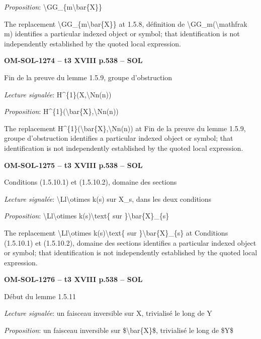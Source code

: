 \emph{Proposition}: \textbackslash{}GG\_\{m\textbackslash{}bar\{X\}\}\par
The replacement \textbackslash{}GG\_\{m\textbackslash{}bar\{X\}\} at 1.5.8, définition de \textbackslash{}GG\_m(\textbackslash{}mathfrak m) identifies a particular indexed object or symbol; that identification is not independently established by the quoted local expression.\par
\par\noindent\textbf{OM-SOL-1274 -- t3 XVIII p.538 -- SOL}\par
Fin de la preuve du lemme 1.5.9, groupe d'obstruction\par
\emph{Lecture signalée}: H\textasciicircum{}\{1\}(X,\textbackslash{}Nn(n))\par
\emph{Proposition}: H\textasciicircum{}\{1\}(\textbackslash{}bar\{X\},\textbackslash{}Nn(n))\par
The replacement H\textasciicircum{}\{1\}(\textbackslash{}bar\{X\},\textbackslash{}Nn(n)) at Fin de la preuve du lemme 1.5.9, groupe d'obstruction identifies a particular indexed object or symbol; that identification is not independently established by the quoted local expression.\par
\par\noindent\textbf{OM-SOL-1275 -- t3 XVIII p.538 -- SOL}\par
Conditions (1.5.10.1) et (1.5.10.2), domaine des sections\par
\emph{Lecture signalée}: \textbackslash{}Ll\textbackslash{}otimes k(s) sur X\_s, dans les deux conditions\par
\emph{Proposition}: \textbackslash{}Ll\textbackslash{}otimes k(s)\textbackslash{}text\{ sur \}\textbackslash{}bar\{X\}\_\{s\}\par
The replacement \textbackslash{}Ll\textbackslash{}otimes k(s)\textbackslash{}text\{ sur \}\textbackslash{}bar\{X\}\_\{s\} at Conditions (1.5.10.1) et (1.5.10.2), domaine des sections identifies a particular indexed object or symbol; that identification is not independently established by the quoted local expression.\par
\par\noindent\textbf{OM-SOL-1276 -- t3 XVIII p.538 -- SOL}\par
Début du lemme 1.5.11\par
\emph{Lecture signalée}: un faisceau inversible sur X, trivialisé le long de Y\par
\emph{Proposition}: un faisceau inversible sur \$\textbackslash{}bar\{X\}\$, trivialisé le long de \$Y\$\par
